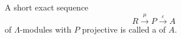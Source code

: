 A short exact sequence
$$R \xrightarrow{\mu} P \xrightarrow{\varepsilon} A$$
of $\Lambda$-modules with $P$ projective is called a  of $A$.
